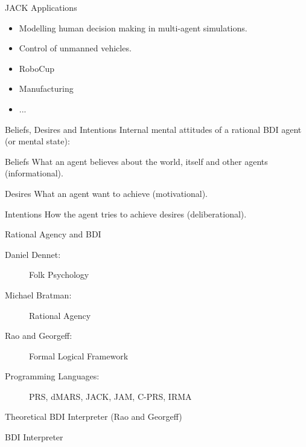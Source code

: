 \documentclass[aspectratio=1610,xcolor=dvipsnames,t]{beamer}
\newcommand{\showcode}[1]{\begin{mdframed}[style=code] %
                          \end{mdframed}%
}
\begin{document}
\begin{frame}{JACK Applications} 
    \begin{itemize}
        \item Modelling human decision making in multi-agent simulations.
        \item Control of unmanned vehicles.
        \item RoboCup
        \item Manufacturing
        \item ...
    \end{itemize}
\end{frame} 

\begin{frame}{Beliefs, Desires and Intentions} 
    Internal mental attitudes of a rational BDI agent (or mental state):
    \begin{block}{Beliefs} 
        What an agent believes about the world, itself and other agents
        (informational).
    \end{block} 
    \begin{block}{Desires} 
        What an agent want to achieve (motivational).
    \end{block} 
    \begin{block}{Intentions} 
        How the agent tries to achieve desires (deliberational).
    \end{block} 
\end{frame} 

\begin{frame}{Rational Agency and BDI} 
    \begin{description}
        \item[Daniel Dennet:] Folk Psychology
        \item[Michael Bratman:] Rational Agency
        \item[Rao and Georgeff:] Formal Logical Framework
        \item[Programming Languages:] PRS, dMARS, JACK, JAM, C-PRS, IRMA
    \end{description} 
\end{frame} 

\begin{frame}{Theoretical BDI Interpreter (Rao and Georgeff)} 
    \begin{block}{BDI Interpreter} 
        \showcode{raogeorgeff.py} 
    \end{block} 
\end{frame} 
\end{document}
